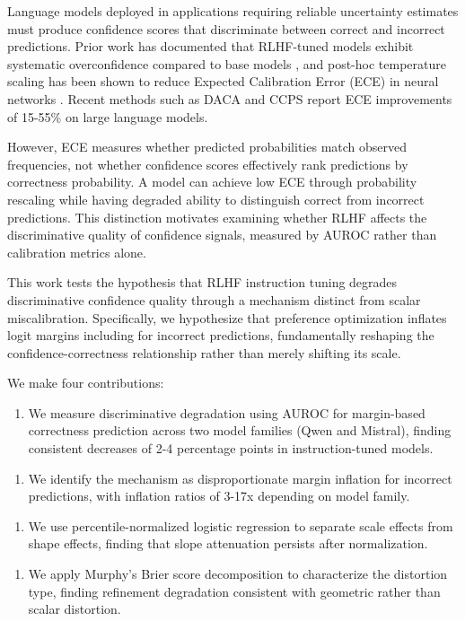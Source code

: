 
Language models deployed in applications requiring reliable uncertainty estimates must produce confidence scores that discriminate between correct and incorrect predictions. Prior work has documented that RLHF-tuned models exhibit systematic overconfidence compared to base models \citep{Tian2023Calibration}, and post-hoc temperature scaling has been shown to reduce Expected Calibration Error (ECE) in neural networks \citep{Guo2017Calibration}. Recent methods such as DACA \citep{Luo2025DACA} and CCPS \citep{Khanmohammadi2025CCPS} report ECE improvements of 15-55\% on large language models.

However, ECE measures whether predicted probabilities match observed frequencies, not whether confidence scores effectively rank predictions by correctness probability. A model can achieve low ECE through probability rescaling while having degraded ability to distinguish correct from incorrect predictions. This distinction motivates examining whether RLHF affects the discriminative quality of confidence signals, measured by AUROC rather than calibration metrics alone.

This work tests the hypothesis that RLHF instruction tuning degrades discriminative confidence quality through a mechanism distinct from scalar miscalibration. Specifically, we hypothesize that preference optimization inflates logit margins including for incorrect predictions, fundamentally reshaping the confidence-correctness relationship rather than merely shifting its scale.

We make four contributions:

\begin{enumerate}
\item We measure discriminative degradation using AUROC for margin-based correctness prediction across two model families (Qwen and Mistral), finding consistent decreases of 2-4 percentage points in instruction-tuned models.
\end{enumerate}

\begin{enumerate}
\item We identify the mechanism as disproportionate margin inflation for incorrect predictions, with inflation ratios of 3-17x depending on model family.
\end{enumerate}

\begin{enumerate}
\item We use percentile-normalized logistic regression to separate scale effects from shape effects, finding that slope attenuation persists after normalization.
\end{enumerate}

\begin{enumerate}
\item We apply Murphy's Brier score decomposition to characterize the distortion type, finding refinement degradation consistent with geometric rather than scalar distortion.
\end{enumerate}
